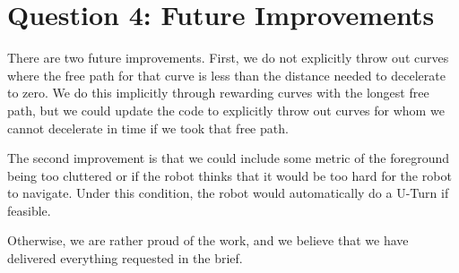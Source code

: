 \section{Question 4: Future Improvements} 

There are two future improvements. First, we do not explicitly throw out curves where the free path for that curve is less than the distance needed to decelerate to zero. We do this implicitly through rewarding curves with the longest free path, but we could update the code to explicitly throw out curves for whom we cannot decelerate in time if we took that free path. 

The second improvement is that we could include some metric of the foreground being too cluttered or if the robot thinks that it would be too hard for the robot to navigate. Under this condition, the robot would automatically do a U-Turn if feasible. 

Otherwise, we are rather proud of the work, and we believe that we have delivered everything requested in the brief. 